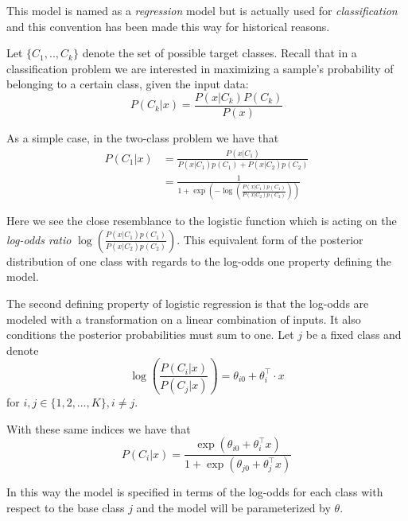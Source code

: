 This model is named as a \textit{regression} model but is actually used for \textit{classification} and this convention has been made this way for historical reasons.


Let $\{C_1,..,C_k\}$ denote the set of possible target classes.
Recall that in a classification problem we are interested in maximizing a sample's probability of belonging to a certain class, given the input data:
\begin{equation}
P(C_k| x) = \frac{P(x|C_k)P(C_k)}{P(x)}
\end{equation}

As a simple case, in the two-class problem we have that
\begin{equation}
\begin{split}
P(C_1| x) & = \frac{P(x|C_1) }{P(x|C_1)p(C_1) + P(x|C_2)p(C_2)} \\
& = \frac{1 }
{1 + \exp \left(- \log \left(  \frac{ P(x|C_1)p(C_1)}
{P(x|C_2)p(C_2)
} \right) \right)
}
\end{split}
\end{equation}

Here we see the close resemblance to the logistic function which is acting on the \textit{log-odds ratio} $ \log \left(  \frac{ P(x|C_1)p(C_1)}{P(x|C_2)p(C_2) } \right)$.
This equivalent form of the posterior distribution of one class with regards to the log-odds one property defining the model.



The second defining property of logistic regression is that the log-odds are modeled with a transformation on a linear combination of inputs.
It also conditions the posterior probabilities must sum to one.
Let $j$ be a fixed class and denote
\begin{equation}\label{logit-logOddss}
 \log \left( \frac{P(C_i|x)}{P(C_j|x)} \right) = \theta_{i0} + \theta_i^\intercal \cdot x
 \end{equation}
for $i,j \in \{1,2,\ldots,K\}, i\neq j$.

With these same indices we have that
\begin{equation} P(C_i|x) = \frac{\exp(\theta_{i0} + \theta_i^\intercal x)}{1 + \exp(\theta_{j0} + \theta_j^\intercal x)}
\end{equation}

In this way the model is specified in terms of the log-odds for each class with respect to the base class $j$ and the model will be parameterized by $\theta$.

